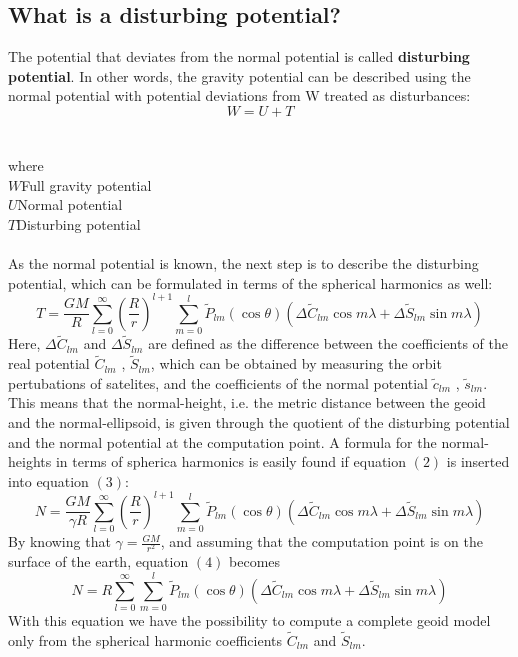 \documentclass[a4paper,12pt]{article}
\newcommand\tab[1][1cm]{\hspace*{#1}}
\begin{document}
\subsection{What is a disturbing potential?}
The potential that deviates from the normal potential is called \textbf{disturbing potential}. In other words, the gravity potential can be described using the normal potential with
potential deviations from W treated as disturbances:
\begin{equation} 
W=U+T
\end{equation}
\\\\where
\\$W$\tab Full gravity potential
\\$U$\tab Normal potential
\\$T$\tab Disturbing potential
\\\\As the normal potential is known, the next step is to describe the disturbing potential, which can be formulated in terms of the spherical harmonics as well:
\begin{equation}
T=\frac{GM}{R}\sum_{l=0}^{\infty} \left(\frac{R}{r}\right)^{l+1}\sum_{m=0}^{l} \widetilde{P}_{lm}(\cos\theta)(\Delta\widetilde{C}_{lm}\cos m\lambda + \Delta\widetilde{S}_{lm}\sin m\lambda)
\end{equation}
Here, $\Delta\widetilde{C}_{lm}$ and $\Delta\widetilde{S}_{lm}$ are defined as the difference between the coefficients of the real potential $\widetilde{C}_{lm}$ , $\widetilde{S}_{lm}$, which can be obtained by measuring the orbit pertubations of satelites, and the coefficients of the normal potential $\widetilde{c}_{lm}$ , $	\widetilde{s}_{lm}$.
This means that the normal-height, i.e. the metric distance between the geoid and
the normal-ellipsoid, is given through the quotient of the disturbing potential and the
normal potential at the computation point. A formula for the normal-heights in terms
of spherica harmonics is easily found if equation $(2)$ is inserted into equation $(3)$:
\begin{equation}
N=\frac{GM}{\gamma R}\sum_{l=0}^{\infty} \left(\frac{R}{r}\right)^{l+1}\sum_{m=0}^{l} \widetilde{P}_{lm}(\cos\theta)(\Delta\widetilde{C}_{lm}\cos m\lambda + \Delta\widetilde{S}_{lm}\sin m\lambda)
\end{equation}
By knowing that $\gamma=\frac{GM}{r^2}$, and assuming that the computation point is on the surface of the earth, equation $(4)$ becomes
\begin{equation}
N=R\sum_{l=0}^{\infty}\sum_{m=0}^{l} \widetilde{P}_{lm}(\cos\theta)(\Delta\widetilde{C}_{lm}\cos m\lambda + \Delta\widetilde{S}_{lm}\sin m\lambda)
\end{equation}
With this equation we have the possibility to compute a complete geoid model only from
the spherical harmonic coefficients $\widetilde{C}_{lm}$ and $\widetilde{S}_{lm}$.\\\\\\
\end{document}
